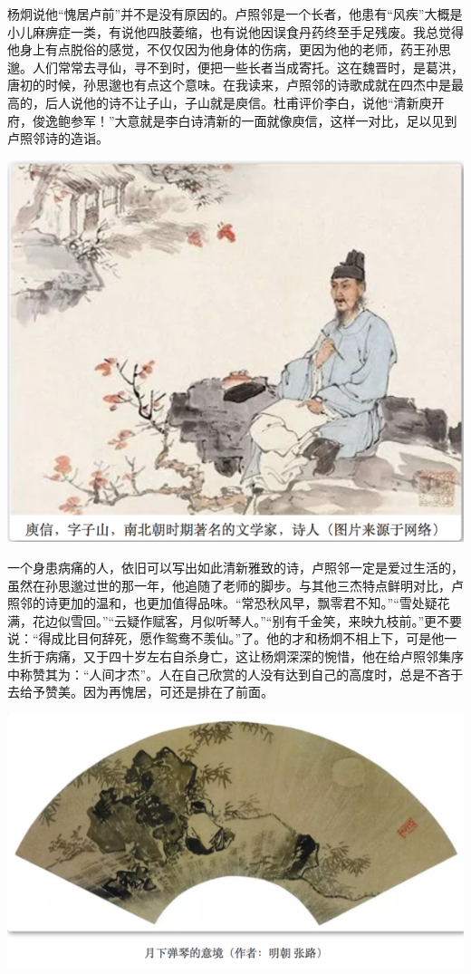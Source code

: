 \documentclass[]{book}
\begin{document}
杨炯说他``愧居卢前''并不是没有原因的。卢照邻是一个长者，他患有``风疾''大概是小儿麻痹症一类，有说他四肢萎缩，也有说他因误食丹药终至手足残废。我总觉得他身上有点脱俗的感觉，不仅仅因为他身体的伤病，更因为他的老师，药王孙思邈。人们常常去寻仙，寻不到时，便把一些长者当成寄托。这在魏晋时，是葛洪，唐初的时候，孙思邈也有点这个意味。在我读来，卢照邻的诗歌成就在四杰中是最高的，后人说他的诗不让子山，子山就是庾信。杜甫评价李白，说他``清新庾开府，俊逸鲍参军！''大意就是李白诗清新的一面就像庾信，这样一对比，足以见到卢照邻诗的造诣。

\includegraphics[width=8.33in]{images/ctsj3}

一个身患病痛的人，依旧可以写出如此清新雅致的诗，卢照邻一定是爱过生活的，虽然在孙思邈过世的那一年，他追随了老师的脚步。与其他三杰特点鲜明对比，卢照邻的诗更加的温和，也更加值得品味。``常恐秋风早，飘零君不知。''``雪处疑花满，花边似雪回。''``云疑作赋客，月似听琴人。''``别有千金笑，来映九枝前。''更不要说：``得成比目何辞死，愿作鸳鸯不羡仙。''了。他的才和杨炯不相上下，可是他一生折于病痛，又于四十岁左右自杀身亡，这让杨炯深深的惋惜，他在给卢照邻集序中称赞其为：``人间才杰''。人在自己欣赏的人没有达到自己的高度时，总是不吝于去给予赞美。因为再愧居，可还是排在了前面。

\includegraphics[width=8.33in]{images/ctsj4}
\end{document}

